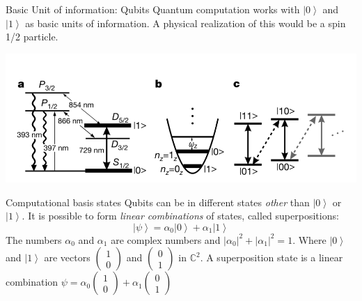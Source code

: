 \documentclass{beamer}
\newcommand{\ket}[1]{\left| #1 \right>} %
\begin{document}
\begin{frame}{Basic Unit of information: Qubits}
	\justifying
	Quantum computation works with $\ket{0}$ and $\ket{1}$ as basic units of information. A physical realization of this would be a spin 1/2 particle.
	
	\center
	\includegraphics[keepaspectratio=true,width=.8\paperwidth]{.attachments/Qubit.png}
\end{frame}


\begin{frame}{Computational basis states}
	\justifying
	Qubits can be in different states \textit{other} than $\ket{0}$ or $\ket{1}$. It is possible to form \textit{linear combinations} of states, called superpositions:
	$$\ket{\psi}= \alpha_0 \ket{0} + \alpha_1 \ket{1}$$
    The numbers $\alpha_0$ and $\alpha_1$ are complex numbers and ${|\alpha_0|}^2+|\alpha_1|^2=1$. 
    \newline
    \newline
Where $\ket{0}$ and $\ket{1}$ are vectors $\begin{pmatrix} 1 \\ 0 \end{pmatrix}$ and $\begin{pmatrix} 0 \\1 \end{pmatrix}$ in ${\mathbb{C}}^2$.
    \newline
    \newline
	A superposition state is a linear combination $ \psi =\alpha_0 \begin{pmatrix} 1 \\ 0 \end{pmatrix} + \alpha_1 \begin{pmatrix} 0 \\ 1 \end{pmatrix}$
\end{frame}
\end{document}
